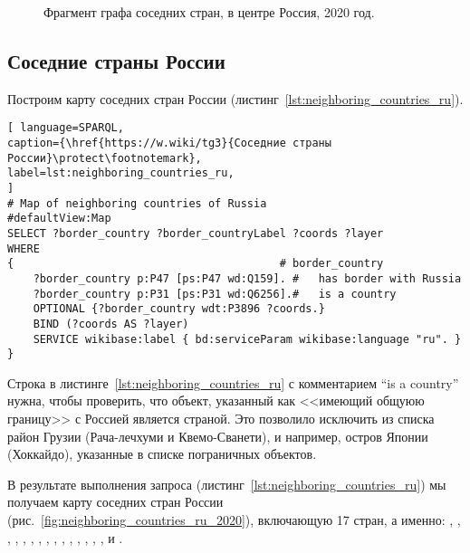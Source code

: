 \begin{figure}
	{
		\setlength{\fboxsep}{0pt}%
		\setlength{\fboxrule}{1pt}%
	}
    \caption[Фрагмент графа соседних стран, 2020 год.]{Фрагмент графа соседних стран, в центре Россия, 2020 год.}
	\label{fig:neighboring_countries_2020}%
\end{figure}

\subsection{Соседние страны России}

Построим карту соседних стран России (листинг~\ref{lst:neighboring_countries_ru}).

\begin{lstlisting}[ language=SPARQL, 
caption={\href{https://w.wiki/tg3}{Соседние страны России}\protect\footnotemark},
label=lst:neighboring_countries_ru, 
]
# Map of neighboring countries of Russia
#defaultView:Map
SELECT ?border_country ?border_countryLabel ?coords ?layer
WHERE 
{                                         # border_country
	?border_country p:P47 [ps:P47 wd:Q159]. #   has border with Russia
	?border_country p:P31 [ps:P31 wd:Q6256].#   is a country
	OPTIONAL {?border_country wdt:P3896 ?coords.}
	BIND (?coords AS ?layer)
	SERVICE wikibase:label { bd:serviceParam wikibase:language "ru". }
}
\end{lstlisting}

Строка в листинге~\ref{lst:neighboring_countries_ru} с комментарием ``is a country'' нужна, чтобы проверить, что объект, указанный как <<имеющий общуюю границу>> с Россией является страной. Это позволило исключить из списка район Грузии (Рача-лечхуми и Квемо-Сванети), и например, остров Японии (Хоккайдо), указанные в списке пограничных объектов.

В результате выполнения запроса (листинг~\ref{lst:neighboring_countries_ru}) мы получаем карту соседних стран России (рис.~\ref{fig:neighboring_countries_ru_2020}), включающую 17 стран, а именно: , , , , , , , , , , , , , , ,  и .


